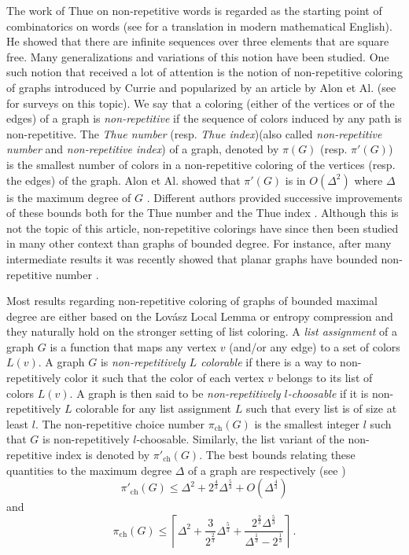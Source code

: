 \documentclass[a4paper,10pt]{article}
\begin{document}
The work of Thue on non-repetitive words is regarded as the starting point of combinatorics on words
\cite{Thue06,Thue1} (see \cite{BerstelThue} for a translation in modern mathematical English).  He showed that there are infinite sequences over three elements that are square free.
Many generalizations and variations of this notion have been studied.
One such notion  that received a lot of attention is the notion of 
non-repetitive coloring of graphs introduced by Currie and popularized by an article by Alon et Al. \cite{alongraph,curriegraph} 
(see \cite{CZERWINSKI2007453,vSkrabuvlakova2015TheTC} for surveys on this topic).
We say that a coloring (either of the vertices or of the edges) of a graph is \emph{non-repetitive} if the sequence of colors induced by any path is non-repetitive.
The \emph{Thue number} (resp. \emph{Thue index})(also called  \emph{non-repetitive number} and \emph{non-repetitive index}) of a graph, denoted by $\pi(G)$ (resp. $\pi'(G)$) is the smallest number of colors in a non-repetitive coloring of the vertices (resp. the edges) of the graph. 
Alon et Al. showed that $\pi'(G)$ is in $O(\Delta^2)$ where $\Delta$ is the maximum degree of $G$ \cite{alongraph}.  
Different authors provided successive improvements of these bounds both for the Thue number and the Thue index \cite{HARANT2012374, Dujmovic2016, MontassierEntropie}.
Although this is not the topic of this article, non-repetitive colorings have since then been studied in many other context than graphs of bounded degree. For instance, after many intermediate results it was recently showed that planar graphs have bounded non-repetitive number \cite{planargraphs}. 

Most results regarding non-repetitive coloring of graphs of bounded maximal degree are either based on the Lov\'asz Local Lemma or entropy compression and they naturally hold on the stronger setting of
list coloring. A \emph{list assignment} of a graph $G$ is a function that maps any vertex $v$ (and/or any edge) to a set of colors $L(v)$.
A graph $G$ is \emph{non-repetitively $L$ colorable} if there is a way to non-repetitively color it such that the color of each vertex $v$ belongs to its list of colors $L(v)$. A graph is then said to be \emph{non-repetitively $l$-choosable} if it is  non-repetitively $L$ colorable for any list assignment $L$ such that every list is of size at least $l$.
The non-repetitive choice number $\pi_{\operatorname{ch}}(G)$ is the smallest integer $l$ such that $G$ is non-repetitively $l$-choosable. Similarly, the list variant of the non-repetitive index is denoted by $\pi'_{\operatorname{ch}}(G)$.
The best bounds relating these quantities to the maximum degree $\Delta$ of a graph are respectively (see \cite{MontassierEntropie})
\begin{equation}
 \pi'_{\operatorname{ch}}(G)\le\Delta^2+2^\frac{4}{3}\Delta^\frac{5}{3}+O(\Delta^\frac{4}{3})
\end{equation}
and 
\begin{equation}\label{ThueChoiceNumberToImprove}
 \pi_{\operatorname{ch}}(G)\le\left\lceil\Delta^2+\frac{3}{2^\frac{2}{3}}\Delta^\frac{5}{3}+\frac{2^\frac{2}{3}\Delta^\frac{5}{3}}{\Delta^\frac{1}{3}-2^\frac{1}{3}}\right\rceil\,.
\end{equation}
\end{document}
